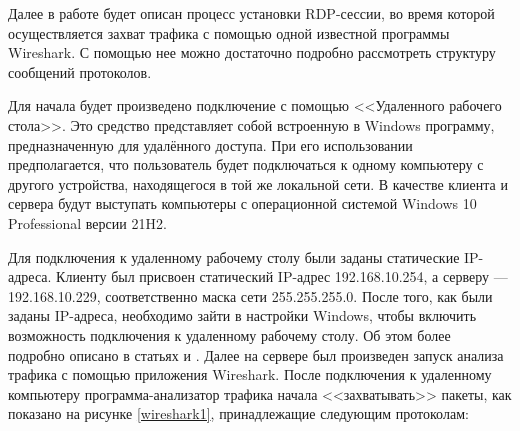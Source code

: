 \documentclass[bachelor, och, coursework]{SCWorks}
\begin{document}
  
  Далее в работе будет описан процесс установки RDP-сессии, во время которой осуществляется захват трафика с помощью одной известной программы Wireshark. С помощью нее
  можно достаточно подробно рассмотреть структуру сообщений протоколов.

  Для начала будет произведено подключение с помощью <<Удаленного рабочего стола>>. Это средство представляет собой встроенную в Windows программу, предназначенную
  для удалённого доступа. При его использовании предполагается, что пользователь будет подключаться к одному компьютеру с другого устройства, находящегося в той же
  локальной сети. В качестве клиента и сервера будут выступать компьютеры с операционной системой Windows 10 Professional версии 21H2. 
  
  Для подключения к удаленному рабочему столу были заданы статические IP-адреса. Клиенту был присвоен статический IP-адрес 192.168.10.254,
  а серверу --- 192.168.10.229, соответственно маска сети 255.255.255.0. После того, как были заданы IP-адреса, необходимо зайти в настройки
  Windows, чтобы включить возможность подключения к удаленному рабочему столу. Об этом более подробно описано
  в статьях \cite{userdp1} и \cite{userdp2}. Далее на сервере был произведен запуск анализа трафика с помощью приложения Wireshark.
  После подключения к удаленному компьютеру программа-анализатор трафика начала <<захватывать>> пакеты, как показано на рисунке \ref{wireshark1},
  принадлежащие следующим протоколам:
  
\end{document}
